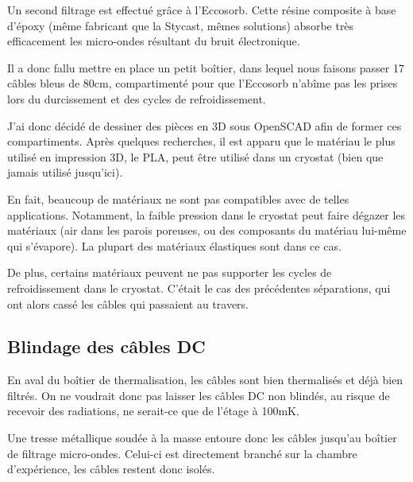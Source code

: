 Un second filtrage est effectué grâce à l'Eccosorb. Cette résine composite à base d'époxy (même fabricant que la Stycast, mêmes solutions) absorbe très efficacement les micro-ondes résultant du bruit électronique.

Il a donc fallu mettre en place un petit boîtier, dans lequel nous faisons passer 17 câbles bleus de 80cm, compartimenté pour que l'Eccosorb n'abîme pas les prises lors du durcissement et des cycles de refroidissement.

J'ai donc décidé de dessiner des pièces en 3D sous OpenSCAD afin de former ces compartiments. Après quelques recherches, il est apparu que le matériau le plus utilisé en impression 3D, le PLA, peut être utilisé dans un cryostat (bien que jamais utilisé jusqu'ici).
\newline

En fait, beaucoup de matériaux ne sont pas compatibles avec de telles applications. Notamment, la faible pression dans le cryostat peut faire dégazer les matériaux (air dans les parois poreuses, ou des composants du matériau lui-même qui s'évapore). La plupart des matériaux élastiques sont dans ce cas.

De plus, certains matériaux peuvent ne pas supporter les cycles de refroidissement dans le cryostat. C'était le cas des précédentes séparations, qui ont alors cassé les câbles qui passaient au travers.

\subsection{Blindage des câbles DC}
En aval du boîtier de thermalisation, les câbles sont bien thermalisés et déjà bien filtrés. On ne voudrait donc pas laisser les câbles DC non blindés, au risque de recevoir des radiations, ne serait-ce que de l'étage à 100mK.

Une tresse métallique soudée à la masse entoure donc les câbles jusqu'au boîtier de filtrage micro-ondes. Celui-ci est directement branché sur la chambre d'expérience, les câbles restent donc isolés.

